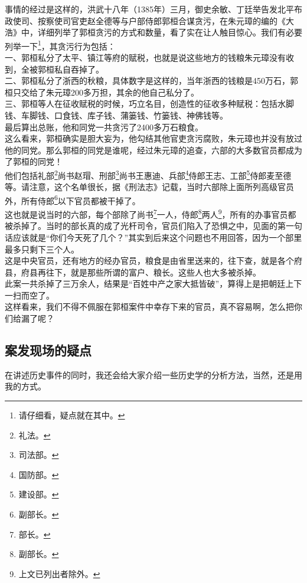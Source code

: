 \begin{multicols}{\theparacolNo}
事情的经过是这样的，洪武十八年（1385年）三月，御史余敏、丁廷举告发北平布政使司、按察使司官吏赵全德等与户部侍郎郭桓合谋贪污，在朱元璋的编的《大浩》中，详细列举了郭桓贪污的方式和数量，看了实在让人触目惊心。我们有必要列举一下\footnote{请仔细看，疑点就在其中。}，其贪污行为包括：\\

一、郭桓私分了太平、镇江等府的赋税，也就是说这些地方的钱粮朱元璋没有收到，全被郭桓私自吞掉了。\\

二、郭桓私分了浙西的秋粮，具体数字是这样的，当年浙西的钱粮是450万石，郭桓只交给了朱元璋200多万担，其余的他自己私分了。\\

三、郭桓等人在征收赋税的时候，巧立名目，创造性的征收多种赋税：包括水脚钱、车脚钱、口食钱、库子钱、蒲篓钱、竹篓钱、神佛钱等。\\

最后算出总账，他和同党一共贪污了2400多万石粮食。\\

这么看来，郭桓确实是胆大妄为，他勾结其他官吏贪污腐败，朱元璋也并没有放过他的同党。那么郭桓的同党是谁呢，经过朱元璋的追查，六部的大多数官员都成为了郭桓的同党！\\

他们包括礼部\footnote{礼法。}尚书赵瑁、刑部\footnote{司法部。}尚书王惠迪、兵部\footnote{国防部。}侍郎王志、工部\footnote{建设部。}侍郎麦至德等。请注意，这个名单很长，据《刑法志》记载，当时六部除上面所列高级官员外，所有侍郎\footnote{副部长。}以下官员都被干掉了。\\

这也就是说当时的六部，每个部除了尚书\footnote{部长。}一人，侍郎\footnote{副部长。}两人\footnote{上文已列出者除外。}，所有的办事官员都被杀掉了。当时的部长真的成了光杆司令，官员们陷入了恐惧之中，见面的第一句话应该就是“你们今天死了几个？”其实到后来这个问题也不用回答，因为一个部里最多只剩下三个人。\\

这是中央官员，还有地方的经办官员，粮食是由省里送来的，往下查，就是各个府县，府县再往下，就是那些所谓的富户、粮长。这些人也大多被杀掉。\\

此案一共杀掉了三万余人，结果是“百姓中产之家大抵皆破”，算得上是把朝廷上下一扫而空了。\\

这样看来，我们不得不佩服在郭桓案件中幸存下来的官员，真不容易啊，怎么把你们给漏了呢？\\

\subsection{案发现场的疑点}
在讲述历史事件的同时，我还会给大家介绍一些历史学的分析方法，当然，还是用我的方式。\\


\end{multicols}
